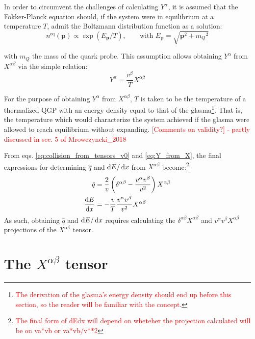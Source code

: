 In order to circumvent the challenges of calculating $Y^\alpha$, it is assumed that the Fokker-Planck equation should, if the system were in equilibrium at a temperature $T$, admit the Boltzmann distribution function as a solution:
\begin{equation*}
	n^{\text{eq}}(\mathbf{p}) \propto \exp(E_\mathbf{p}/T), \qquad \text{with } E_\mathbf{p} = \sqrt{\mathbf{p}^2 + {m_Q}^2}
\end{equation*}

\noindent with $m_Q$ the mass of the quark probe. This assumption allows obtaining $Y^\alpha$ from $X^{\alpha\beta}$ via the simple relation:
\begin{equation}
	Y^\alpha = \frac{v^\beta}{T} X^{\alpha\beta}
	\label{eq:Y_from_X}
\end{equation}

For the purpose of obtaining $Y^\alpha$ from $X^{\alpha\beta}$, $T$ is taken to be the temperature of a thermalized QGP with an energy density equal to that of the glasma\textcolor{red}{\footnote{\textcolor{red}{The derivation of the glasma's energy density should end up before this section, so the reader will be familiar with the concept.}}}. That is, the temperature which would characterize the system achieved if the glasma were allowed to reach equilibrium without expanding. \textcolor{red}{[Comments on validity?] - partly discussed in sec. 5 of Mrowczyncki\_2018}

From eqs. \ref{eq:collision_from_tensors_v0} and \ref{eq:Y_from_X}, the final expressions for determining $\hat{q}$ and $\mathop{}\!\mathrm{d} E / \mathop{}\!\mathrm{d} x$ from $X^{\alpha \beta}$ become:\textcolor{red}{\footnote{\textcolor{red}{The final form of dEdx will depend on wheteher the projection calculated will be on va*vb or va*vb/v**2}}}
\begin{subequations}
	\begin{align}
		\hat{q} & = \frac{2}{v} \left(\delta^{\alpha \beta} - \frac{v^\alpha v^\beta}{v^2} \right) X^{\alpha\beta} \\
		\frac{\mathop{}\!\mathrm{d} E}{\mathop{}\!\mathrm{d} x} &= - \frac{v}{T}\frac{v^\alpha v^\beta}{v^2} X^{\alpha \beta}
	\end{align}
	\label{eq:collision_from_tensors}
\end{subequations}
As such, obtaining $\hat{q}$ and $\mathop{}\!\mathrm{d} E / \mathop{}\!\mathrm{d} x$ requires calculating the $\delta^{\alpha \beta} X^{\alpha \beta}$ and $v^\alpha v^\beta X^{\alpha \beta}$ projections of the $X^{\alpha \beta}$ tensor.

\section{The $X^{\alpha \beta}$ tensor}

